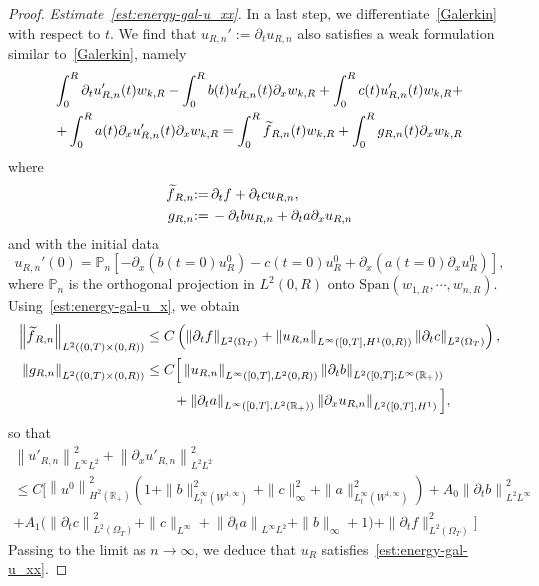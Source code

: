 \documentclass[AHL,Unicode,longabstracts,published]{cedram}
\newcommand{\R}{\mathbb{R}}
\newcommand{\p}{\partial}
\newcommand{\Span}{\mathrm{Span}}
\newcommand{\bbP}{\mathbb{P}}
\let\oldtilde\tilde
\renewcommand*{\tilde}[1]{\mathchoice{\widetilde{#1}}{\widetilde{#1}}{\oldtilde{#1}}{\oldtilde{#1}}}
\begin{document}
\begin{proof}
\emph{Estimate~\eqref{est:energy-gal-u_xx}.}
In a last step, we differentiate~\eqref{Galerkin} with respect to $t$. We find that $u_{R,n}':=\p_t u_{R,n}$ also satisfies a weak formulation similar to~\eqref{Galerkin}, namely
\begin{multline}\label{Galerkin-bis}
\int_0^R\p_t u_{R,n}'(t)w_{k,R} - \int_0^R b(t)u_{R,n}'(t) \p_x w_{k,R} + \int_0^R c(t)u_{R,n}'(t) w_{k,R}+\\ + \int_0^R a(t) \p_x u_{R,n}'(t) \p_x w_{k,R} =\int_0^R \tilde f_{R,n}(t) w_{k,R} + \int_0^R g_{R,n}(t) \p_x w_{k,R}
\end{multline}
where
\begin{align*}
\tilde f_{R,n} &{:=}\, \p_t f + \p_t c u_{R,n},\\
g_{R,n} &{:=}\,- \p_t b u_{R,n} + \p_t a \p_x u_{R,n}
\end{align*}
and with the initial data
\[
u_{R,n}'(0)=\bbP_n\left[-\p_x \left(b(t=0) u_{R}^0\right) - c(t=0) u_R^0 + \p_x \left(a(t=0) \p_x u_R^0\right)\right],
\]
where $\bbP_n$ is the orthogonal projection in $L^2(0,R)$ onto $\Span(w_{1,R}, \cdots, w_{n,R})$. Using~\eqref{est:energy-gal-u_x}, we obtain
\begin{align*}
\left\| \tilde f_{R,n}\right\|_{L^2\left((0,T)\times (0,R)\right)} & \leq C \left(\left\|\p_t f\right\|_{L^2(\Omega_T)} + \left\|u_{R,n}\right\|_{L^\infty\left([0,T], H^1(0,R)\right)} \left\|\p_t c\right\|_{L^2(\Omega_T)}\right),\\
\left\|g_{R,n}\right\|_{L^2\left((0,T)\times (0,R)\right)} & \leq C\Big[\left\|u_{R,n}\right\|_{L^\infty\left([0,T], L^2(0,R)\right)} \left\|\p_t b\right\|_{L^2\left([0,T];L^\infty(\R_+)\right)} \\
& \qquad + \left\|\p_t a\right\|_{L^\infty\left([0,T], L^2(\R_+)\right)}\left\|\p_x u_{R,n}\right\|_{L^2\left([0,T], H^1\right)}\Big],
\end{align*}
so that
\begin{multline*}
\left\|u'_{R,n}\right\|_{L^\infty L^2}^2 + 
\left\|\partial_x u'_{R,n}\right\|_{L^2L^2}^2 \\
 \leq C\Big[\left\|u^0\right\|_{H^2(\R_+)}^2 \left(1 + \| b\|_{L^\infty_t\left(W^{1,\infty}\right)}^2 + \|c\|_\infty^2 + \| a\|_{L^\infty_t\left(W^{1,\infty}\right)}^2\right)+ A_0\left\|\partial_t b\right\|_{L^2 L^\infty}^2\\
+ A_1\big(\left\|\partial_t c\right\|_{L^2(\Omega_T)}^2+ \|c\|_{L^\infty} + \left\|\partial_t a\right\|_{L^\infty L^2} + \|b\|_\infty+1\big) + \|\partial_t f\|_{L^2(\Omega_T)}^2 \Big]
\end{multline*}
Passing to the limit as $n\to \infty$, we deduce that $u_R$ satisfies~\eqref{est:energy-gal-u_xx}.




\end{proof}
\end{document}
